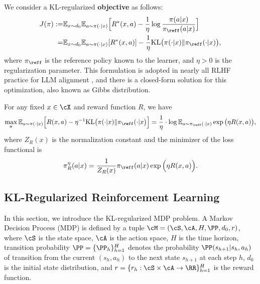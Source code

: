 \documentclass[11pt]{article}
\newcommand{\rE}{\mathbb E}
\newcommand{\E}{\mathbb E}
\newcommand{\KL}{\mathrm{KL}}
\begin{document}
We consider a KL-regularized \textbf{objective} as follows: 
\begin{equation*}
{
\begin{aligned} 
    J(\pi) :=& \rE_{x \sim d_0} \rE_{a \sim \pi(\cdot | x)} \Big[R^*(x, a) - \frac{1}{\eta} \log \frac{\pi(a|x)}{\pi_{\reff}(a|x)}\Big]\\
    =& \rE_{x \sim d_0} \rE_{a \sim \pi(\cdot | x)} [R^*(x, a)] - \frac{1}{\eta}\KL\big(\pi(\cdot|x)\| \pi_{\reff}(\cdot|x)\big),
\end{aligned}}
\end{equation*}
where $\pi_{\reff}$ is the reference policy known to the learner, and $\eta > 0$ is the regularization parameter. This formulation is adopted in nearly all RLHF practice for LLM alignment \citep{bai2022training, ouyang2022training, touvron2023llama}, and there is a closed-form solution for this optimization, also known as Gibbs distribution.
\begin{lemma} \label{lem:kl_solu} 
For any fixed $x \in \cX$ and reward function $R$, we have
\begin{equation*}
{
\begin{aligned}
    \max_{\pi} \E_{a \sim \pi(\cdot|x)} \Big[R(x,a) - \eta^{-1} \KL\big(\pi(\cdot|x)\|\pi_{\reff}(\cdot|x \big)\Big] = \frac{1}{\eta} \cdot \log \E_{a \sim \pi_{\reff}(\cdot|x)} \exp \big(\eta R(x,a)\big), 
\end{aligned}}
\end{equation*}
where $Z_R(x)$ is the normalization constant and the minimizer of the loss functional is 
\begin{align*}
    \pi_R^\eta(a|x) = \frac{1}{Z_R(x)} \pi_{\reff}(a|x)\exp\Big( \eta R(x,a)\Big).
\end{align*} 
\end{lemma}

\subsection{KL-Regularized Reinforcement Learning}
In this section, we introduce the KL-regularized MDP problem. A Markov Decision Process (MDP) is defined by a tuple $\cM = (\cS, \cA, H, \PP, d_0, r)$, where $\cS$ is the state space, $\cA$ is the action space, $H$ is the time horizon, transition probability $\PP=\{\PP_h\}_{h=1}^H$ denotes the probability $\PP(s_{h+1}|s_h,a_h)$ of transition from the current $(s_h,a_h)$ to the next state $s_{h+1}$ at each step $h$, $d_0$ is the initial state distribution, and $r=\{r_h:\cS\times\cA\rightarrow\RR\}_{h=1}^H$ is the reward function. 
\end{document}
